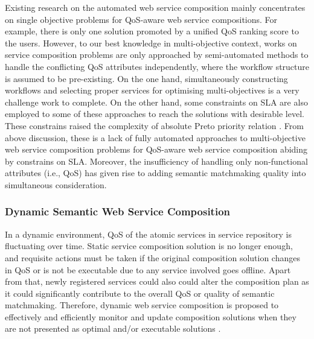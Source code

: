 Existing research on the automated web service composition mainly concentrates on single objective problems for QoS-aware web service compositions. For example, there is only one solution promoted by a unified QoS ranking score to the users. However, to our best knowledge in multi-objective context, works  \cite{liu2005dynamic,wada2012e3,yao2009qos,yin2014hybrid} on service composition problems are only approached by semi-automated methods to handle the conflicting QoS attributes independently, where the workflow structure is assumed to be pre-existing. On the one hand, simultaneously constructing workflows and selecting proper services for optimising multi-objectives is a very challenge work to complete. On the other hand, some constraints on SLA are also employed to some of these approaches to reach the solutions with desirable level. These constrains raised the complexity of absolute Preto priority relation \cite{garey1979guide}. From above discussion, these is a lack of fully automated approaches to multi-objective web service composition problems for QoS-aware web service composition abiding by constrains on SLA. Moreover, the insufficiency of handling only non-functional attributes (i.e., QoS) has given rise to adding semantic matchmaking quality into simultaneous consideration.

\subsubsection{Dynamic Semantic Web Service Composition}
In a dynamic environment, QoS of the atomic services in service repository is fluctuating over time. Static service composition solution is no longer enough, and requisite actions must be taken if the original composition solution changes in QoS or is not be executable due to any service involved goes offline. Apart from that, newly registered services could also could alter the composition plan as it could significantly contribute to the overall QoS or quality of semantic matchmaking. Therefore, dynamic web service composition is proposed to effectively and efficiently monitor and update composition solutions when they are not presented as optimal and/or executable solutions \cite{li2014fault}. 


